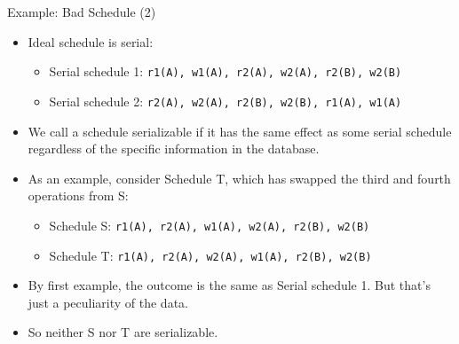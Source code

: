 \documentclass[aspectratio=169, xcolor=dvipsnames]{beamer}
\begin{document}
\begin{frame}{Example: Bad Schedule (2)}
    \begin{itemize}[<+->]
        \item Ideal schedule is serial:
        \begin{itemize}[<+->]
            \item Serial schedule 1: \texttt{r1(A), w1(A), r2(A), w2(A), r2(B), w2(B)}
            \item Serial schedule 2: \texttt{r2(A), w2(A), r2(B), w2(B), r1(A), w1(A)}
        \end{itemize}
        \item We call a schedule serializable if it has the same effect as some serial schedule regardless of the specific information in the database.
        \item As an example, consider Schedule T, which has swapped the third and fourth operations from S:
        \begin{itemize}[<+->]
            \item Schedule S: \texttt{r1(A), r2(A), w1(A), w2(A), r2(B), w2(B)}
            \item Schedule T: \texttt{r1(A), r2(A), w2(A), w1(A), r2(B), w2(B)}
        \end{itemize}
        \item By first example, the outcome is the same as Serial schedule 1. But that's just a peculiarity of the data. 
        \item So neither S nor T are serializable.
    \end{itemize}
\end{frame}
\end{document}
